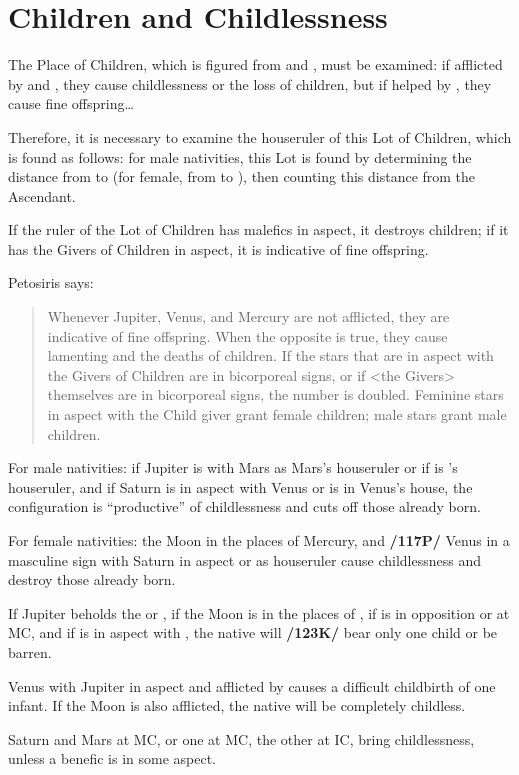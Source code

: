 \section{Children and Childlessness}
The Place of Children, which is figured from \Mercury\xspace and \Venus, must be examined: if afflicted by \Saturn\xspace and \Mars, they cause childlessness or the loss of children, but if helped by \Jupiter, they cause fine offspring\ldots

Therefore, it is necessary to examine the houseruler of this Lot of Children, which is found as follows: for male nativities, this Lot is found by determining the distance from \Jupiter\xspace to \Mercury\xspace (for female, from \Jupiter\xspace to \Venus), then counting this distance from the Ascendant. 

If the ruler of the Lot of Children has malefics in aspect, it destroys children; if it has the Givers of Children in aspect, it is indicative of fine offspring.

Petosiris says:\begin{quote}Whenever Jupiter, Venus, and Mercury are not afflicted, they are indicative of fine offspring. When the opposite is true, they cause lamenting and the deaths of children. If the stars that are in aspect with the Givers of Children are in bicorporeal signs, or if <the Givers> themselves are in bicorporeal signs, the number is doubled. Feminine stars in aspect with the Child giver grant female children; male stars grant male children.\end{quote}

For male nativities: if Jupiter is with Mars as Mars’s houseruler or if \Mars\xspace is \Jupiter’s houseruler, and if Saturn is in aspect with Venus or is in Venus's house, the configuration is “productive” of childlessness and cuts off those already born.

For female nativities: the Moon in the places of Mercury, and \textbf{/117P/} Venus in a masculine sign with Saturn in aspect or as houseruler cause childlessness and destroy those already born. 

If Jupiter beholds the \Moon\xspace or \Venus, if the Moon is in the places of \Mercury, if \Saturn\xspace is in opposition or at MC, and if \Mars\xspace is in aspect with \Saturn, the native will \textbf{/123K/} bear only one child or be barren. 

Venus with Jupiter in aspect and afflicted by \Saturn\xspace causes a difficult childbirth of one infant. If the Moon is also afflicted, the native will be completely childless. 

Saturn and Mars at MC, or one at MC, the other at IC, bring childlessness, unless a benefic is in some aspect.

\newpage